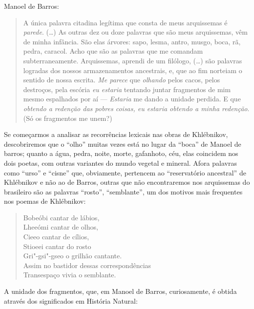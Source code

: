 Manoel de Barros:

\begin{quote}
A única palavra citadina legítima que consta de meus arquissemas é
\emph{parede}. (\ldots{}) As outras dez ou doze palavras que são meus
arquissemas, vêm de minha infância. São elas árvores: sapo, lesma,
antro, musgo, boca, rã, pedra, caracol. Acho que são as palavras que me
comandam subterraneamente. Arquissemas, aprendi de um filólogo, (\ldots{}) são
palavras logradas dos nossos armazenamentos ancestrais, e, que ao fim
norteiam o sentido de nossa escrita.
\emph{Me parece} que \emph{olhando} pelos cacos, pelos destroços, pela
escória \emph{eu estaria} tentando juntar fragmentos de mim mesmo
espalhados por aí --- \emph{Estaria} me dando a unidade perdida. E
que \emph{obtendo a redenção das pobres coisas, eu estaria obtendo a
minha redenção}. (Só os fragmentos me unem?)
\end{quote}

Se começarmos a analisar as recorrências lexicais nas obras de
Khlébnikov, descobriremos que o ``olho'' muitas vezes está no lugar da
``boca'' de Manoel de barros; quanto a água, pedra, noite, morte,
gafanhoto, céu, elas coincidem nos dois poetas, com outras variantes do
mundo vegetal e mineral. Afora palavras como ``urso'' e ``cisne'' que,
obviamente, pertencem ao ``reservatório ancestral'' de Khlébnikov e não
ao de Barros, outras que não encontraremos nos arquissemas do brasileiro
são as palavras ``rosto'', ``semblante'', um dos motivos mais frequentes
nos poemas de Khlébnikov:

\begin{verse}
Bobeóbi cantar de lábios,\\
Lheeómi cantar de olhos,\\
Cieeo cantar de cílios,\\
Stioeei cantar do rosto\\
Gri"-gsi"-gseo o grilhão cantante.\\
Assim no bastidor dessas correspondências\\
Transespaço vivia o semblante.
\end{verse}

A unidade dos fragmentos, que, em Manoel de Barros, curiosamente, é
obtida através dos significados em História Natural:


